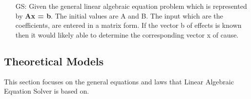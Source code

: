 \documentclass[12pt]{article}
\newcounter{goalnum} %
\newcommand{\progname}{Linear Algebraic Equation Solver} %
\begin{document}
\begin{itemize}

\item[GS\refstepcounter{goalnum}\thegoalnum \label{G_solveforx}:] {
Given the general linear algebraic equation problem which is represented by
\textbf{Ax = b}. The initial values are A and B. The input which are the coefficients, are entered in a matrix form. If the vector b of effects is known then it would likely able to determine the corresponding vector x of cause.}

\end{itemize}




\subsection{Theoretical Models}\label{sec_theoretical}

This section focuses on the general equations and laws that \progname{} is based
on.  

~\newline
\end{document}
